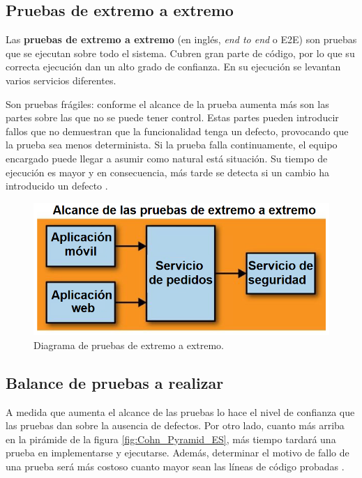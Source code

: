 \documentclass[11pt,spanish,listoffigures]{tfgetsinf}
\begin{document}
\subsection{Pruebas de extremo a extremo}

Las \textbf{pruebas de extremo a extremo} (en inglés, \textit{end to end} o E2E) \cite{Newman2015a} son pruebas que se ejecutan sobre todo el sistema. Cubren gran parte de código, por lo que su correcta ejecución dan un alto grado de confianza. En su ejecución se levantan varios servicios diferentes.

Son pruebas frágiles: conforme el alcance de la prueba aumenta más son las partes sobre las que no se puede tener control. Estas partes pueden introducir fallos que no demuestran que la funcionalidad tenga un defecto, provocando que la prueba sea menos determinista. Si la prueba falla continuamente, el equipo encargado puede llegar a asumir como natural está situación. Su tiempo de ejecución es mayor y en consecuencia, más tarde se detecta si un cambio ha introducido un defecto \cite{Newman2015a}.

\begin{figure}[h]
\centering
\includegraphics[scale=0.5]{End_To_End_Test_ES}
\caption{Diagrama de pruebas de extremo a extremo.}
\end{figure}

\subsection{Balance de pruebas a realizar}

A medida que aumenta el alcance de las pruebas lo hace el nivel de confianza que las pruebas dan sobre la ausencia de defectos. Por otro lado, cuanto más arriba en la pirámide de la figura \ref{fig:Cohn_Pyramid_ES}, más tiempo tardará una prueba en implementarse y ejecutarse. Además, determinar el motivo de fallo de una prueba será más costoso cuanto mayor sean las líneas de código probadas \cite{Cohn2010}.
\end{document}
